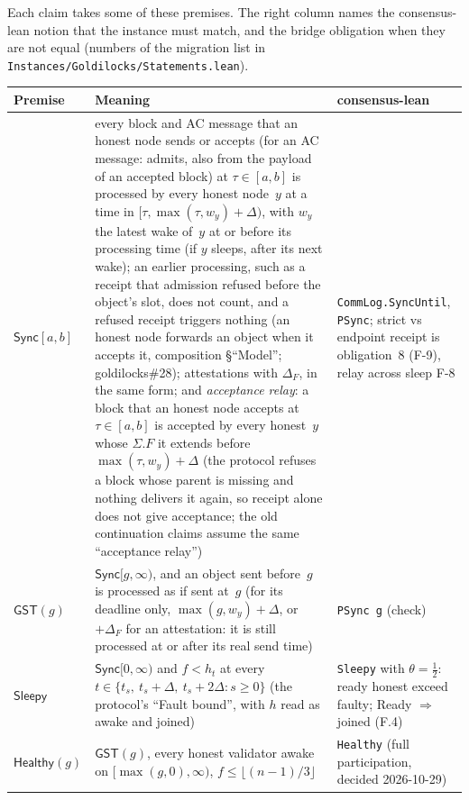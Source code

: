 \documentclass{article}
\begin{document}
Each claim takes some of these premises.  The right column names the
consensus-lean notion that the instance must match, and the bridge obligation
when they are not equal (numbers of the migration list in
\texttt{Instances/Goldilocks/Statements.lean}).

\begin{longtable}{@{}>{\raggedright\arraybackslash}p{2.2cm}>{\raggedright\arraybackslash}p{6.4cm}>{\raggedright\arraybackslash}p{4.6cm}@{}}
\hline
Premise & Meaning & consensus-lean\\
\hline
$\mathsf{Sync}[a,b]$ & every block and AC message that an honest node sends
  or accepts (for an AC message: admits, also from the payload of an accepted
  block) at $\tau\in[a,b]$ is processed by
  every honest node~$y$ at a time in $[\tau,\max(\tau,w_y)+\Delta)$, with $w_y$
  the latest wake of~$y$ at or before its processing time (if $y$ sleeps,
  after its next wake); an earlier processing, such as a receipt that
  admission refused before the object's slot, does not count, and a refused
  receipt triggers nothing (an honest node forwards an object when it accepts
  it, composition \S``Model''; goldilocks\#28);
  attestations with $\Delta_F$, in the same form; and \emph{acceptance relay}: a block that an
  honest node accepts at $\tau\in[a,b]$ is accepted by every honest~$y$ whose
  $\Sigma.F$ it extends before $\max(\tau,w_y)+\Delta$ (the protocol refuses a
  block whose parent is missing and nothing delivers it again, so receipt
  alone does not give acceptance; the old continuation claims assume the same
  ``acceptance relay'') &
  \texttt{CommLog.SyncUntil}, \texttt{PSync}; strict vs endpoint receipt is
  obligation~8 (F-9), relay across sleep F-8\\
$\mathsf{GST}(g)$ & $\mathsf{Sync}[g,\infty)$, and an object sent before~$g$
  is processed as if sent at~$g$ (for its deadline only, $\max(g,w_y)+\Delta$,
  or $+\Delta_F$ for an attestation: it is still processed at or after its
  real send time) & \texttt{PSync g} (check)\\
$\mathsf{Sleepy}$ & $\mathsf{Sync}[0,\infty)$ and $f<h_t$ at every
  $t\in\{t_s,\ t_s+\Delta,\ t_s+2\Delta : s\geq0\}$ (the protocol's ``Fault bound'', with $h$ read
  as awake and joined) &
  \texttt{Sleepy} with $\theta=\tfrac12$: ready honest exceed faulty; Ready
  $\Rightarrow$ joined (F.4)\\
$\mathsf{Healthy}(g)$ & $\mathsf{GST}(g)$, every honest validator awake on
  $[\max(g,0),\infty)$, $f\leq\lfloor(n-1)/3\rfloor$ & \texttt{Healthy}
  (full participation, decided 2026-10-29)\\

\end{longtable}
\end{document}
